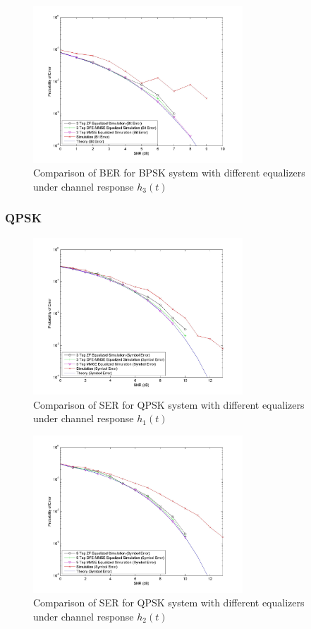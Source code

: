 \documentclass[]{article}
\begin{document}
\begin{figure}[H]
\centering
\includegraphics[width=0.7\textwidth]{bpSNR3.jpg}
\caption{Comparison of BER for BPSK system with different equalizers under channel response $h_3(t)$}
\end{figure}

\subsubsection{QPSK}

\begin{figure}[H]
\centering
\includegraphics[width=0.7\textwidth]{qpSNR1.jpg}
\caption{Comparison of SER for QPSK system with different equalizers under channel response $h_1(t)$}
\end{figure}

\begin{figure}[H]
\centering
\includegraphics[width=0.7\textwidth]{qpSNR2.jpg}
\caption{Comparison of SER for QPSK system with different equalizers under channel response $h_2(t)$}
\end{figure}
\end{document}
